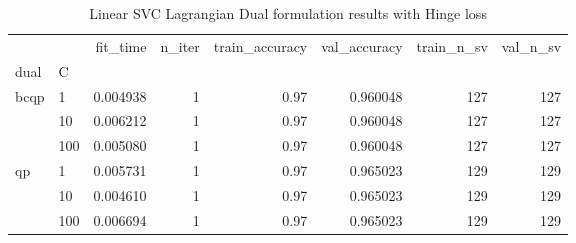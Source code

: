\begin{table}[h!]
\centering
\caption{Linear SVC Lagrangian Dual formulation results with Hinge loss}
\label{linear_lagrangian_dual_svc_cv_results}
\begin{tabular}{llrrrrrr}
\toprule
   &     &  fit\_time &  n\_iter &  train\_accuracy &  val\_accuracy &  train\_n\_sv &  val\_n\_sv \\
dual & C &           &         &                 &               &             &           \\
\midrule
bcqp & 1   &  0.004938 &       1 &            0.97 &      0.960048 &         127 &       127 \\
   & 10  &  0.006212 &       1 &            0.97 &      0.960048 &         127 &       127 \\
   & 100 &  0.005080 &       1 &            0.97 &      0.960048 &         127 &       127 \\
qp & 1   &  0.005731 &       1 &            0.97 &      0.965023 &         129 &       129 \\
   & 10  &  0.004610 &       1 &            0.97 &      0.965023 &         129 &       129 \\
   & 100 &  0.006694 &       1 &            0.97 &      0.965023 &         129 &       129 \\
\bottomrule
\end{tabular}
\end{table}
